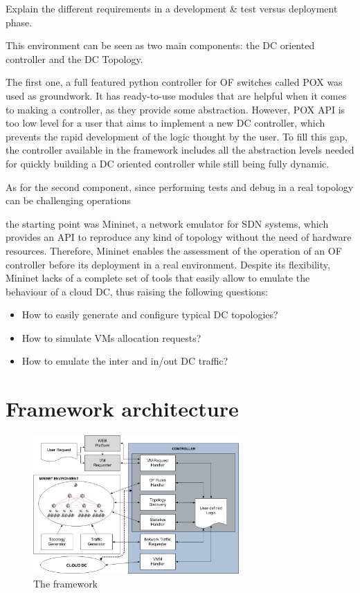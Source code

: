 \documentclass[12pt,english]{book}
\begin{document}
Explain the different requirements in a development \& test versus deployment phase.

This environment can be seen as two main components: the DC oriented controller and the DC Topology.

The first one, a full featured python controller for OF switches called POX was used as groundwork. It has ready-to-use modules that are helpful when it comes to making a controller, as they provide some abstraction.
However, POX API is too low level for a user that aims to implement a new DC controller, which prevents the rapid development of the logic thought by the user.
To fill this gap, the controller available in the framework includes all the abstraction levels needed for quickly building a DC oriented controller while still being fully dynamic.

As for the second component, since performing tests and debug in a real topology can be challenging operations

the starting point was Mininet, a network emulator for SDN systems, which provides an API to reproduce any kind of topology without the need of hardware resources.
Therefore, Mininet enables the assessment of the operation of an OF controller before its deployment in a real environment.
Despite its flexibility, Mininet lacks of a complete set of tools that easily allow to emulate the behaviour of a cloud DC, thus raising the following questions:
 
\begin{itemize}
\item How to easily generate and configure typical DC topologies?
\item How to simulate VMs allocation requests?
\item How to emulate the inter and in/out DC traffic?
\end{itemize}


\section{Framework architecture}

\begin{figure}[htbp]
        \centering
        \includegraphics[width=0.7\textwidth]{figures/emulator_new.png}
        \caption{The framework}
        \label{fig:framework}
\end{figure}
\end{document}
